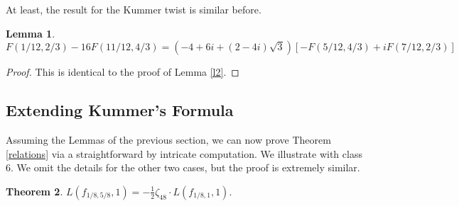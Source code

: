 \documentclass[12pt]{amsart}
\newtheorem{theorem}{Theorem}[section]
\newtheorem{Lemma}[theorem]{Lemma}
\theoremstyle{definition}
\theoremstyle{remark}
\begin{document}
At least, the result for the Kummer twist is similar before.

\begin{Lemma}\label{l6}
    $$ F(1/12,2/3)-16F(11/12,4/3)  = 
(-4 + 6 i + (2 - 4 i) \sqrt{3})[- F( 5/12,4/3)+iF(7/12,2/3) ]$$
\end{Lemma}

\begin{proof}
This is identical to the proof of Lemma \ref{l2}.
\end{proof}


\subsection{Extending Kummer's Formula}
Assuming the Lemmas of the previous section, we can now prove Theorem \ref{relations} via a straightforward by intricate computation. We illustrate with class 6. We omit the details for the other two cases, but the proof is extremely similar. 


\begin{theorem}\label{f5}
    $L(f_{1/8,5/8},1)=-\frac{1}{2}\zeta_{48}\cdot L(f_{1/8,1},1).$
\end{theorem}
\end{document}
